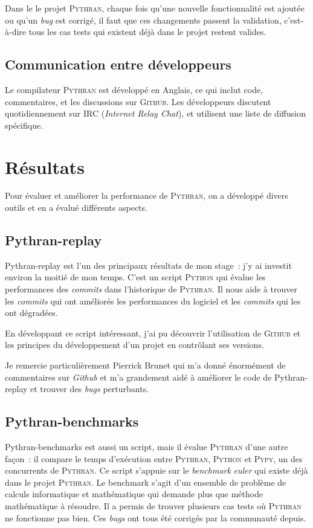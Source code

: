 \documentclass[a4paper, 11pt]{article}
\newcommand\Pythran{\textsc{Pythran}}
\newcommand\Python{\textsc{Python}}
\newcommand\Pypy{\textsc{Pypy}}
\newcommand\Github{\textsc{Github}}
\begin{document}
Dans le le projet \Pythran{}, chaque fois  qu'une nouvelle fonctionnalité est ajoutée ou
qu'un \emph{bug} est corrigé, il faut que ces changements passent la validation,
c'est-à-dire tous les cas tests qui existent déjà dans le projet restent valides.


\subsection*{Communication entre développeurs}

Le compilateur \Pythran{} est développé en Anglais, ce qui inclut code,
commentaires, et les discussions sur \Github{}.
Les développeurs discutent quotidiennement sur IRC (\emph{Internet Relay Chat}), et utilisent une liste de diffusion spécifique.

\section{Résultats}
\label{sec:resultats}

Pour évaluer et améliorer la performance de \Pythran{}, on a développé
divers outils et en a évalué différents aspects.

\subsection*{Pythran-replay}

Pythran-replay \cite{pythran-replay} est l'un des principaux résultats de mon stage~:
j'y ai investit environ la moitié de mon temps. C'est un script
\Python{} qui évalue les performances des \emph{commits} dans l'historique de \Pythran{}.
Il nous aide à trouver les \emph{commits} qui ont améliorés les
performances du logiciel et les \emph{commits} qui les ont dégradées.


En développant ce script intéressant, j'ai pu découvrir l'utilisation de
\Github{} et les principes du développement d'un projet en contrôlant ses versions.

Je remercie particulièrement Pierrick Brunet qui m'a donné énormément de
commentaires sur \emph{Github} et m'a grandement aidé à améliorer le code de Pythran-replay et
trouver des \emph{bugs} perturbants.

\subsection*{Pythran-benchmarks}

Pythran-benchmarks est aussi un script, mais il évalue \Pythran{} d'une autre
façon~:
il compare le temps d'exécution entre \Pythran{}, \Python{} et \Pypy{},
un des concurrents de \Pythran{}. Ce script s'appuie sur le \emph{benchmark}
\emph{euler} qui existe déjà dans le projet \Pythran{}.
Le benchmark s'agit d'un ensemble de problème de calculs informatique et mathématique
qui demande plus que méthode mathématique à résoudre.  Il a permis de trouver plusieurs
cas tests où \Pythran{} ne fonctionne pas bien.
Ces \emph{bugs} ont tous été corrigés par la communauté depuis.
\end{document}

